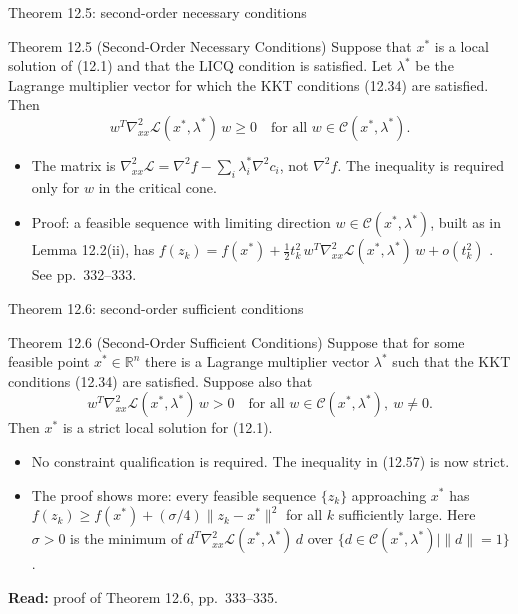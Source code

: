 \documentclass[aspectratio=169,12pt]{beamer}
\newcommand{\R}{\mathbb{R}}
\newcommand{\xs}{x^{*}}
\newcommand{\hessf}{\nabla^{2} f}
\newcommand{\eqn}[1]{\text{\small(#1)}}
\newcommand{\readbook}[1]{{\color{red}\textbf{Read:} #1}}
\newcommand{\ls}{\lambda^{*}}
\newcommand{\cC}{\mathcal{C}}
\newcommand{\cL}{\mathcal{L}}
\newcommand{\hessL}{\nabla_{xx}^{2}\cL}
\begin{document}
\begin{frame}{Theorem 12.5: second-order necessary conditions}
  \begin{block}{Theorem 12.5 (Second-Order Necessary Conditions)}
    Suppose that $\xs$ is a local solution of (12.1) and that the LICQ condition is satisfied. Let $\ls$
    be the Lagrange multiplier vector for which the KKT conditions (12.34) are satisfied. Then
    \[ w^{T}\hessL(\xs,\ls)\,w\ge 0\quad\text{for all } w\in\cC(\xs,\ls) . \tag{12.57} \]
  \end{block}
  \begin{itemize}\setlength\itemsep{0.3em}
    \item The matrix is $\hessL=\hessf-\sum_{i}\ls_{i}\nabla^{2}c_{i}$, not $\hessf$.
      The inequality is required only for $w$ in the critical cone.
    \item Proof: a feasible sequence with limiting direction $w\in\cC(\xs,\ls)$, built as in
      Lemma 12.2(ii), has $f(z_{k})=f(\xs)+\tfrac12 t_{k}^{2}\,w^{T}\hessL(\xs,\ls)\,w+o(t_{k}^{2})$ \eqn{12.64}.
      See pp.~332--333.
  \end{itemize}
\end{frame}

\begin{frame}{Theorem 12.6: second-order sufficient conditions}
  \begin{block}{Theorem 12.6 (Second-Order Sufficient Conditions)}
    Suppose that for some feasible point $\xs\in\R^{n}$ there is a Lagrange multiplier vector $\ls$
    such that the KKT conditions (12.34) are satisfied. Suppose also that
    \[ w^{T}\hessL(\xs,\ls)\,w>0\quad\text{for all } w\in\cC(\xs,\ls),\ w\ne 0 . \tag{12.65} \]
    Then $\xs$ is a strict local solution for (12.1).
  \end{block}
  \begin{itemize}\setlength\itemsep{0.35em}
    \item No constraint qualification is required. The inequality in (12.57) is now strict.
    \item The proof shows more: every feasible sequence $\{z_{k}\}$ approaching $\xs$ has
      $f(z_{k})\ge f(\xs)+(\sigma/4)\|z_{k}-\xs\|^{2}$ for all $k$ sufficiently large. Here $\sigma>0$ is
      the minimum of $d^{T}\hessL(\xs,\ls)\,d$ over $\{d\in\cC(\xs,\ls)\mid\|d\|=1\}$.
  \end{itemize}
  \readbook{proof of Theorem 12.6, pp.~333--335.}
\end{frame}
\end{document}
